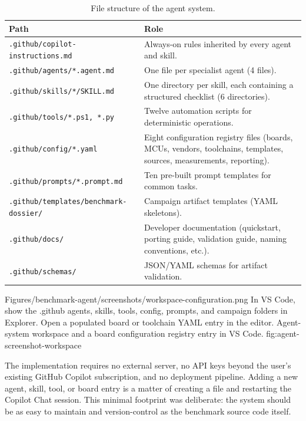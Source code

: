 \begin{table}[H]
\centering
\caption{File structure of the agent system.}
\label{tab:agent-impl}
\begin{tabularx}{\textwidth}{l X}
\toprule
\textbf{Path} & \textbf{Role} \\
\midrule
\texttt{.github/copilot-instructions.md} & Always-on rules inherited by every agent and skill. \\
\texttt{.github/agents/*.agent.md} & One file per specialist agent (4 files). \\
\texttt{.github/skills/*/SKILL.md} & One directory per skill, each containing a structured checklist (6 directories). \\
\texttt{.github/tools/*.ps1, *.py} & Twelve automation scripts for deterministic operations. \\
\texttt{.github/config/*.yaml} & Eight configuration registry files (boards, MCUs, vendors, toolchains, templates, sources, measurements, reporting). \\
\texttt{.github/prompts/*.prompt.md} & Ten pre-built prompt templates for common tasks. \\
\texttt{.github/templates/benchmark-dossier/} & Campaign artifact templates (YAML skeletons). \\
\texttt{.github/docs/} & Developer documentation (quickstart, porting guide, validation guide, naming conventions, etc.). \\
\texttt{.github/schemas/} & JSON/YAML schemas for artifact validation. \\
\bottomrule
\end{tabularx}
\end{table}

\reportscreenshot
	{Figures/benchmark-agent/screenshots/workspace-configuration.png}
	{In VS Code, show the .github agents, skills, tools, config, prompts, and campaign folders in Explorer. Open a populated board or toolchain YAML entry in the editor.}
	{Agent-system workspace and a board configuration registry entry in VS Code.}
	{fig:agent-screenshot-workspace}

The implementation requires no external server, no API keys beyond the user's existing
GitHub Copilot subscription, and no deployment pipeline. Adding a new agent, skill, tool,
or board entry is a matter of creating a file and restarting the Copilot Chat session. This
minimal footprint was deliberate: the system should be as easy to maintain and
version-control as the benchmark source code itself.


